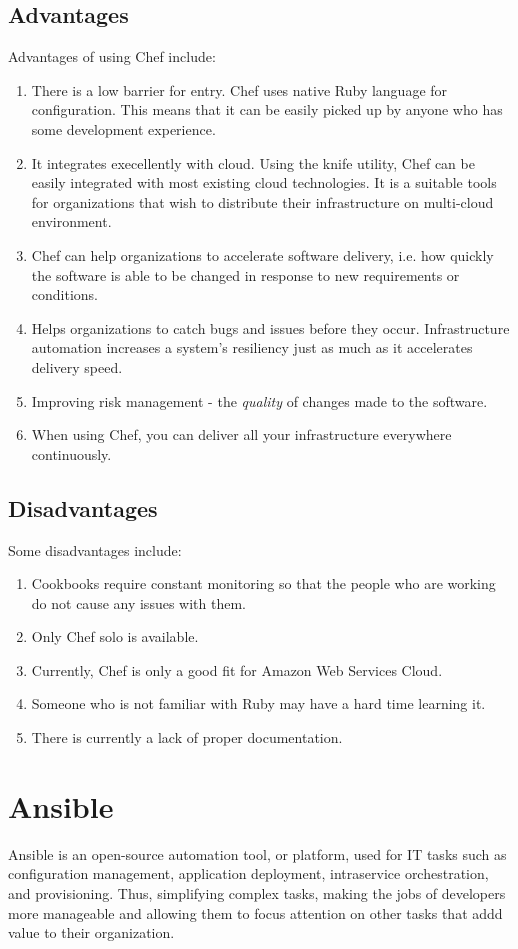 \documentclass[a4paper, 12pt]{article}
\begin{document}
\subsection{Advantages}
Advantages of using Chef include:
\begin{enumerate}
\item
There is a low barrier for entry. Chef uses native Ruby language for configuration. This means that it can be easily picked up by anyone who has some development experience.
\item
It integrates execellently with cloud. Using the knife utility, Chef can be easily integrated with most existing cloud technologies. It is a suitable tools for organizations that wish to distribute their infrastructure on multi-cloud environment. 
\item
Chef can help organizations to accelerate software delivery, i.e. how quickly the software is able to be changed in response to new requirements or conditions. 
\item
Helps organizations to catch bugs and issues before they occur. Infrastructure automation increases a system's resiliency just as much as it accelerates delivery speed. 
\item
Improving risk management - the \textit{quality} of changes made to the software.
\item
When using Chef, you can deliver all your infrastructure everywhere continuously.
\end{enumerate}

\subsection{Disadvantages}
Some disadvantages include:
\begin{enumerate}
\item
Cookbooks require constant monitoring so that the people who are working do not cause any issues with them. 
\item
Only Chef solo is available. 
\item
Currently, Chef is only a good fit for Amazon Web Services Cloud. 
\item
Someone who is not familiar with Ruby may have a hard time learning it.
\item
There is currently a lack of proper documentation.
\end{enumerate}

\newpage
\section{Ansible}
Ansible is an open-source automation tool, or platform, used for IT tasks such as configuration management, application deployment, intraservice orchestration, and provisioning. Thus, simplifying complex tasks, making the jobs of developers more manageable and allowing them to focus attention on other tasks that addd value to their organization. 
\end{document}
